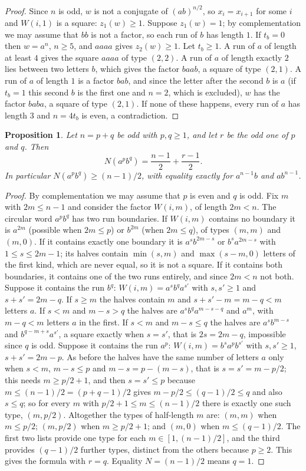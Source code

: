 \documentclass[11pt,reqno]{amsart}
\newtheorem{proposition}[theorem]{Proposition}
\theoremstyle{definition}
\begin{document}
\begin{proof}
Since $n$ is odd, $w$ is not a conjugate of $(ab)^{n/2}$, so $x_i=x_{i+1}$ for some $i$ and $W(i,1)$ is a square: $z_1(w)\ge 1$. Suppose $z_1(w)=1$; by complementation we may assume that $bb$ is not a factor, so each run of $b$ has length $1$. If $t_b=0$ then $w=a^n$, $n\ge 5$, and $aaaa$ gives $z_2(w)\ge 1$. Let $t_b\ge 1$. A run of $a$ of length at least $4$ gives the square $aaaa$ of type $(2,2)$. A run of $a$ of length exactly $2$ lies between two letters $b$, which gives the factor $baab$, a square of type $(2,1)$. A run of $a$ of length $1$ is a factor $bab$, and since the letter after the second $b$ is $a$ (if $t_b=1$ this second $b$ is the first one and $n=2$, which is excluded), $w$ has the factor $baba$, a square of type $(2,1)$. If none of these happens, every run of $a$ has length $3$ and $n=4t_b$ is even, a contradiction.
\end{proof}

\begin{proposition}\label{prop:tworuns}
Let $n=p+q$ be odd with $p,q\ge 1$, and let $r$ be the odd one of $p$ and $q$. Then
\[
N(a^pb^q)=\frac{n-1}{2}+\frac{r-1}{2}.
\]
In particular $N(a^pb^q)\ge(n-1)/2$, with equality exactly for $a^{n-1}b$ and $ab^{n-1}$.
\end{proposition}

\begin{proof}
By complementation we may assume that $p$ is even and $q$ is odd. Fix $m$ with $2m\le n-1$ and consider the factor $W(i,m)$, of length $2m<n$. The circular word $a^pb^q$ has two run boundaries. If $W(i,m)$ contains no boundary it is $a^{2m}$ (possible when $2m\le p$) or $b^{2m}$ (when $2m\le q$), of types $(m,m)$ and $(m,0)$. If it contains exactly one boundary it is $a^sb^{2m-s}$ or $b^sa^{2m-s}$ with $1\le s\le 2m-1$; its halves contain $\min(s,m)$ and $\max(s-m,0)$ letters of the first kind, which are never equal, so it is not a square. If it contains both boundaries, it contains one of the two runs entirely, and since $2m<n$ not both. Suppose it contains the run $b^q$: $W(i,m)=a^sb^qa^{s'}$ with $s,s'\ge 1$ and $s+s'=2m-q$. If $s\ge m$ the halves contain $m$ and $s+s'-m=m-q<m$ letters $a$. If $s<m$ and $m-s>q$ the halves are $a^sb^qa^{m-s-q}$ and $a^m$, with $m-q<m$ letters $a$ in the first. If $s<m$ and $m-s\le q$ the halves are $a^sb^{m-s}$ and $b^{q-m+s}a^{s'}$, a square exactly when $s=s'$, that is $2s=2m-q$, impossible since $q$ is odd. Suppose it contains the run $a^p$: $W(i,m)=b^sa^pb^{s'}$ with $s,s'\ge 1$, $s+s'=2m-p$. As before the halves have the same number of letters $a$ only when $s<m$, $m-s\le p$ and $m-s=p-(m-s)$, that is $s=s'=m-p/2$; this needs $m\ge p/2+1$, and then $s=s'\le p$ because $m\le(n-1)/2=(p+q-1)/2$ gives $m-p/2\le(q-1)/2\le q$ and also $s\le q$; so for every $m$ with $p/2+1\le m\le(n-1)/2$ there is exactly one such type, $(m,p/2)$. Altogether the types of half-length $m$ are: $(m,m)$ when $m\le p/2$; $(m,p/2)$ when $m\ge p/2+1$; and $(m,0)$ when $m\le(q-1)/2$. The first two lists provide one type for each $m\in[1,(n-1)/2]$, and the third provides $(q-1)/2$ further types, distinct from the others because $p\ge 2$. This gives the formula with $r=q$. Equality $N=(n-1)/2$ means $q=1$.
\end{proof}
\end{document}
